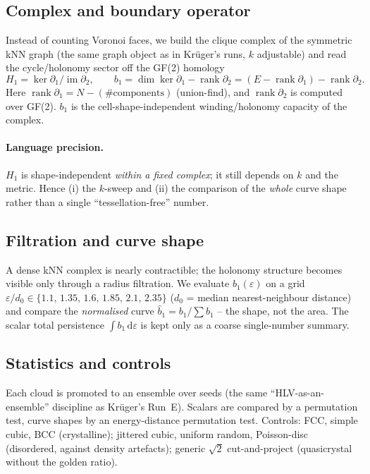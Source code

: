 \subsection{Complex and boundary operator}
Instead of counting Voronoi faces, we build the clique complex of the
symmetric kNN graph (the same graph object as in Krüger's runs, $k$
adjustable) and read the cycle/holonomy sector off the GF(2) homology
\[
  H_1 = \ker \partial_1 / \operatorname{im} \partial_2,
  \qquad
  b_1 = \dim\ker\partial_1 - \operatorname{rank}\partial_2
      = (E - \operatorname{rank}\partial_1) - \operatorname{rank}\partial_2 .
\]
Here $\operatorname{rank}\partial_1 = N - (\#\text{components})$ (union-find),
and $\operatorname{rank}\partial_2$ is computed over GF(2). $b_1$ is the
cell-shape-independent winding/holonomy capacity of the complex.

\paragraph{Language precision.} $H_1$ is shape-independent \emph{within a fixed
complex}; it still depends on $k$ and the metric. Hence (i) the $k$-sweep and
(ii) the comparison of the \emph{whole} curve shape rather than a single
``tessellation-free'' number.

\subsection{Filtration and curve shape}
A dense kNN complex is nearly contractible; the holonomy structure becomes
visible only through a radius filtration. We evaluate $b_1(\varepsilon)$ on a
grid $\varepsilon/d_0 \in \{1.1,\,1.35,\,1.6,\,1.85,\,2.1,\,2.35\}$ ($d_0$ =
median nearest-neighbour distance) and compare the \emph{normalised} curve
$\hat b_1 = b_1/\sum b_1$ -- the shape, not the area. The scalar total
persistence $\int b_1\,\mathrm{d}\varepsilon$ is kept only as a coarse
single-number summary.

\subsection{Statistics and controls}
Each cloud is promoted to an ensemble over seeds (the same
``HLV-as-an-ensemble'' discipline as Krüger's Run~E). Scalars are compared by a
permutation test, curve shapes by an energy-distance permutation test.
Controls: FCC, simple cubic, BCC (crystalline); jittered cubic, uniform
random, Poisson-disc (disordered, against density artefacts); generic
$\sqrt{2}$ cut-and-project (quasicrystal without the golden ratio).

